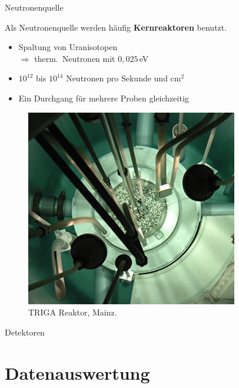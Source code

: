 \documentclass[xcolor=dvipsnames, aspectratio=169]{beamer}
\begin{document}
\begin{frame}{Neutronenquelle}
\begin{minipage}{0.52\textwidth}
Als Neutronenquelle werden häufig \textbf{Kernreaktoren} benutzt.\smallskip

\begin{itemize}
\item Spaltung von Uranisotopen\\$\Rightarrow$ therm.\ Neutronen mit $0,025$\,eV
\item $10^{12}$ bis $10^{14}$ Neutronen pro Sekunde und cm$^2$
\item Ein Durchgang für \alert{mehrere Proben gleichzeitig}
\end{itemize}
\end{minipage}\hfill
\begin{minipage}{0.44\textwidth}
\begin{figure}
\includegraphics[width=\textwidth]{img/reactor-mainz.png}
\caption{TRIGA Reaktor, Mainz.}
\end{figure}
\end{minipage}
\end{frame}

\begin{frame}{Detektoren}

\end{frame}

\section{Datenauswertung}
\end{document}
